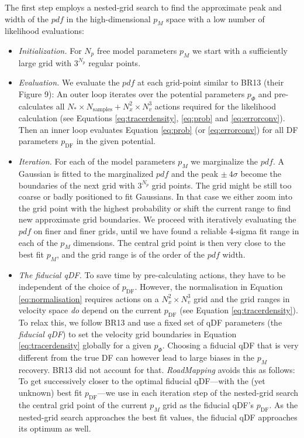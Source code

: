 \documentclass[iop,revtex4]{emulateapj}
\newcommand{\pdf}{\ensuremath{pdf}}
\newcommand{\pmodel}{\ensuremath{p_M}}
\newcommand{\RM}{{\sl RoadMapping}}
\begin{document}
The first step employs a nested-grid search to find the approximate peak and width of the \pdf{} in the high-dimensional \pmodel{}  space with a low number of likelihood evaluations:

\begin{itemize}
\item \emph{Initialization.} For $N_p$ free model parameters \pmodel{} we start with a sufficiently large grid with $3^{N_p}$ regular points.

\item  \emph{Evaluation.} We evaluate the \pdf{} at each grid-point similar to BR13 (their Figure 9):  An outer loop iterates over the potential parameters $p_\Phi$ and pre-calculates all $N_* \times N_\text{samples} + N_x^2 \times N_v^3$ actions required for the likelihood calculation (see Equations \eqref{eq:tracerdensity}, \eqref{eq:prob} and \eqref{eq:errorconv}). Then an inner loop evaluates Equation \eqref{eq:prob} (or \eqref{eq:errorconv}) for all DF parameters $p_\text{DF}$ in the given potential.

\item \emph{Iteration.} For each of the model parameters \pmodel{} we marginalize the \pdf{}. A Gaussian is fitted to the marginalized \pdf{} and the peak $\pm ~ 4\sigma$ become the boundaries of the next grid with $3^{N_p}$ grid points. The grid might be still too coarse or badly positioned to fit Gaussians. In that case we either zoom into the grid point with the highest probability or shift the current range to find new approximate grid boundaries. We proceed with iteratively evaluating the \pdf{} on finer and finer grids, until we have found a reliable 4-sigma fit range in each of the \pmodel{} dimensions. The central grid point is then very close to the best fit \pmodel{}, and the grid range is of the order of the \pdf{} width.

\item \emph{The fiducial qDF.} To save time by pre-calculating actions, they have to be independent of the choice of $p_\text{DF}$. However, the normalisation in Equation \eqref{eq:normalisation} requires actions on a $N_x^2 \times N_v^3$ grid and the grid ranges in velocity space \emph{do} depend on the current $p_\text{DF}$ (see Equation \eqref{eq:tracerdensity}). To relax this, we follow BR13 and use a fixed set of qDF parameters (the \emph{fiducial qDF}) to set the velocity grid boundaries in Equation \eqref{eq:tracerdensity} globally for a given $p_\Phi$. Choosing a fiducial qDF that is very different from the true DF can however lead to large biases in the \pmodel{} recovery. BR13 did not account for that. \RM{} avoids this as follows: To get successively closer to the optimal fiducial qDF---with the (yet unknown) best fit $p_\text{DF}$---we use in each iteration step of the nested-grid search the central grid point of the current \pmodel{} grid as the fiducial qDF's $p_\text{DF}$.  As the nested-grid search approaches the best fit values, the fiducial qDF approaches its optimum as well. 


\end{itemize}
\end{document}
